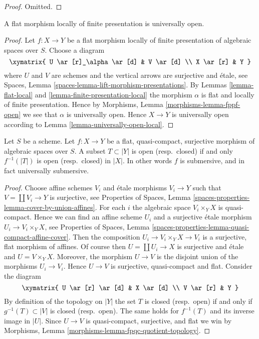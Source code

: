\begin{proof}
Omitted.
\end{proof}

\begin{lemma}
\label{lemma-fppf-open}
A flat morphism locally of finite presentation is universally open.
\end{lemma}

\begin{proof}
Let $f : X \to Y$ be a flat morphism locally of finite presentation
of algebraic spaces over $S$. Choose a diagram
$$
\xymatrix{
U \ar[r]_\alpha \ar[d] & V \ar[d] \\
X \ar[r] & Y
}
$$
where $U$ and $V$ are schemes and the vertical arrows are surjective and
\'etale, see
Spaces, Lemma \ref{spaces-lemma-lift-morphism-presentations}.
By
Lemmas \ref{lemma-flat-local} and \ref{lemma-finite-presentation-local}
the morphism $\alpha$ is flat and locally of finite presentation.
Hence by
Morphisms, Lemma \ref{morphisms-lemma-fppf-open}
we see that $\alpha$ is universally open.
Hence $X \to Y$ is universally open according to
Lemma \ref{lemma-universally-open-local}.
\end{proof}

\begin{lemma}
\label{lemma-fpqc-quotient-topology}
Let $S$ be a scheme.
Let $f : X \to Y$ be a flat, quasi-compact, surjective morphism of
algebraic spaces over $S$.
A subset $T \subset |Y|$ is open (resp.\ closed) if and only
$f^{-1}(|T|)$ is open (resp.\ closed) in $|X|$.
In other words $f$ is submersive, and in fact universally submersive.
\end{lemma}

\begin{proof}
Choose affine schemes $V_i$ and \'etale morphisms $V_i \to Y$ such that
$V = \coprod V_i \to Y$ is surjective, see
Properties of Spaces,
Lemma \ref{spaces-properties-lemma-cover-by-union-affines}.
For each $i$ the algebraic space $V_i \times_Y X$ is quasi-compact.
Hence we can find an affine scheme $U_i$ and a surjective \'etale morphism
$U_i \to V_i \times_Y X$, see
Properties of Spaces,
Lemma \ref{spaces-properties-lemma-quasi-compact-affine-cover}.
Then the composition $U_i \to V_i \times_Y X \to V_i$ is a surjective,
flat morphism of affines.
Of course then $U = \coprod U_i \to X$ is surjective and \'etale
and $U = V \times_Y X$. Moreover, the morphism $U \to V$ is the
disjoint union of the morphisms $U_i \to V_i$. Hence $U \to V$ is surjective,
quasi-compact and flat. Consider the diagram
$$
\xymatrix{
U \ar[r] \ar[d] & X \ar[d] \\
V \ar[r] & Y
}
$$
By definition of the topology on $|Y|$ the set $T$ is closed
(resp.\ open) if and only if $g^{-1}(T) \subset |V|$ is closed
(resp.\ open). The same holds for
$f^{-1}(T)$ and its inverse image in $|U|$.
Since $U \to V$ is quasi-compact, surjective,  and flat we win by
Morphisms, Lemma \ref{morphisms-lemma-fpqc-quotient-topology}.
\end{proof}

